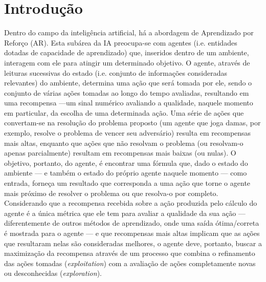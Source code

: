 \documentclass[cic,tc]{iiufrgs}
\begin{document}

\tableofcontents

\chapter{Introdução}
 Dentro do campo da inteligência artificial, há a abordagem de Aprendizado por Reforço (AR). Esta subárea da IA preocupa-se com
 agentes (i.e.  entidades dotadas de capacidade de aprendizado) que, inseridos dentro de um ambiente, interagem com ele para atingir um determinado objetivo.
O agente, através de leituras sucessivas do estado (i.e. conjunto de informações consideradas relevantes) do ambiente, determina uma ação que será tomada por ele,
 sendo o conjunto de várias ações tomadas ao longo do tempo avaliadas, resultando em uma recompensa ---um sinal numérico avaliando a qualidade, naquele momento
 em particular, da escolha de uma determinada ação. Uma série de ações que convertam-se na resolução do problema proposto (um agente que joga damas, por exemplo,
 resolve o problema de vencer seu adversário) resulta
 em recompensas mais altas, enquanto que ações que não resolvam o problema (ou resolvam-o apenas parcialmente) resultam em
 recompensas mais baixas (ou nulas). O objetivo, portanto, do agente, é encontrar uma fórmula que, dado o estado do ambiente
 --- e também o estado do próprio agente naquele momento --- como entrada, forneça um resultado que corresponda a uma ação que torne
 o agente mais próximo de resolver o problema ou que resolva-o por completo. Considerando que a recompensa recebida sobre a ação produzida pelo
 cálculo do agente é a única métrica que ele tem para avaliar a qualidade da sua ação --- diferentemente de outros
 métodos de aprendizado, onde uma saída ótima/correta é mostrada para o agente --- e que recompensas mais altas implicam
 que as ações que resultaram nelas são consideradas melhores, o agente deve, portanto, buscar a maximização da recompensa através
 de um processo que combina o refinamento das ações tomadas (\textit{exploitation}) com a avaliação de ações completamente novas ou
 desconhecidas (\textit{exploration}).
\end{document}
